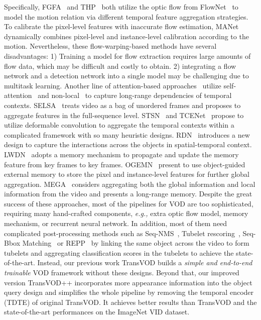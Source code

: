 \documentclass[10pt,journal,compsoc]{IEEEtran}
\begin{document}
Specifically, FGFA~\cite{zhu17fgfa} and THP~\cite{zhu18hp} both utilize the optic flow from FlowNet~\cite{dosovitskiy2015flownet} to model the motion relation via different temporal feature aggregation strategies. To calibrate the pixel-level features with inaccurate flow estimation, MANet~\cite{wang18manet} dynamically combines pixel-level and instance-level calibration according to the motion. Nevertheless, these flow-warping-based methods have several disadvantages: 1) Training a model for flow extraction requires large amounts of flow data, which may be difficult and costly to obtain. 2) integrating a flow network and a detection network into a single model may be challenging due to multitask learning. Another line of attention-based approaches~\cite{wu19selsa,he2020temporal,bertasius18stsn,jiang2019video,deng2019ogemn,chen2020memory} utilize self-attention~\cite{vaswani2017attention} and non-local~\cite{wang2018non} to capture long-range dependencies of temporal contexts. SELSA~\cite{wu19selsa} treats video as a bag of unordered frames and proposes to aggregate features in the full-sequence level. STSN~\cite{bertasius18stsn} and TCENet~\cite{he2020temporal} propose to utilize deformable convolution to aggregate the temporal contexts within a complicated framework with so many heuristic designs. RDN~\cite{deng19rdn} introduces a new design to capture the interactions across the objects in spatial-temporal context. LWDN~\cite{jiang2019video} adopts a memory mechanism to propagate and update the memory feature from key frames to key frames. OGEMN~\cite{deng2019ogemn} present to use object-guided external memory to store the pixel and instance-level features for further global aggregation. MEGA~\cite{chen2020memory} considers aggregating both the global information and local information from the video and presents a long-range memory. Despite the great success of these approaches, most of the pipelines for VOD are too sophisticated, requiring many hand-crafted components, \emph{e.g.,} extra optic flow model, memory mechanism, or recurrent neural network. In addition, most of them need complicated post-processing methods such as Seq-NMS~\cite{han2016seq}, Tubelet rescoring~\cite{kang2017t}, Seq-Bbox Matching~\cite{belhassen2019improving}  or REPP~\cite{sabater2020robust} by linking the same object across the video to form tubelets and aggregating classification scores in the tubelets to achieve the state-of-the-art. Instead, our previous work TransVOD builds a \textit{simple and end-to-end trainable} VOD framework without these designs. Beyond that, our improved version TransVOD++ incorporates more appearance information into the object query design and simplifies the whole pipeline by removing the temporal encoder (TDTE) of original TransVOD. It achieves better results than TransVOD and the state-of-the-art performances on the ImageNet VID dataset.
\end{document}
